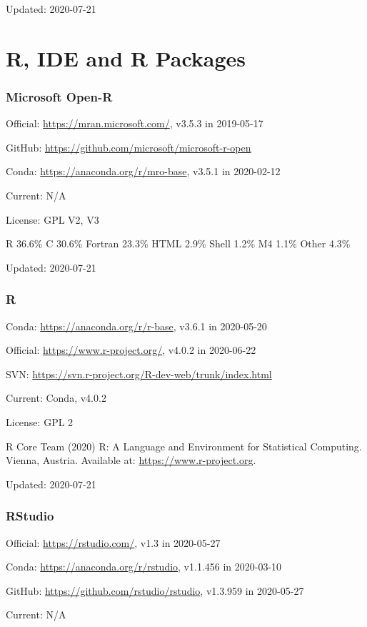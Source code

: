 \documentclass[]{article}
\begin{document}
Updated: 2020-07-21

\part{R, IDE and R Packages}

\section{Microsoft Open-R}

Official: \url{https://mran.microsoft.com/}, v3.5.3 in 2019-05-17

GitHub: \url{https://github.com/microsoft/microsoft-r-open}

Conda: \url{https://anaconda.org/r/mro-base}, v3.5.1 in 2020-02-12

Current: N/A

License: GPL V2, V3

R 36.6\% C 30.6\% Fortran 23.3\% HTML 2.9\% Shell 1.2\% M4 1.1\% Other 4.3\%

Updated: 2020-07-21

\section{R}

Conda: \url{https://anaconda.org/r/r-base}, v3.6.1 in 2020-05-20

Official: \url{https://www.r-project.org/}, v4.0.2 in 2020-06-22

SVN: \url{https://svn.r-project.org/R-dev-web/trunk/index.html}

Current: Conda, v4.0.2

License: GPL 2

R Core Team (2020) R: A Language and Environment for Statistical Computing. Vienna, Austria. Available at: \url{https://www.r-project.org}.

Updated: 2020-07-21

\section{RStudio}

Official: \url{https://rstudio.com/}, v1.3 in 2020-05-27

Conda: \url{https://anaconda.org/r/rstudio}, v1.1.456 in 2020-03-10

GitHub: \url{https://github.com/rstudio/rstudio}, v1.3.959 in 2020-05-27

Current: N/A
\end{document}
